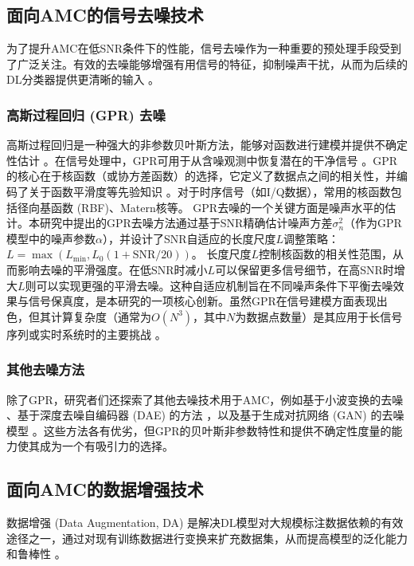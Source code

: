\documentclass[conference]{IEEEtran}
\begin{document}
\subsection{面向AMC的信号去噪技术}
为了提升AMC在低SNR条件下的性能，信号去噪作为一种重要的预处理手段受到了广泛关注。有效的去噪能够增强有用信号的特征，抑制噪声干扰，从而为后续的DL分类器提供更清晰的输入 \cite{b1}\cite{[15]}\cite{[16_MISSING]}\cite{[20]}\cite{[30_MISSING]}\cite{[52_MISSING]}。
\subsubsection{高斯过程回归 (GPR) 去噪}
高斯过程回归是一种强大的非参数贝叶斯方法，能够对函数进行建模并提供不确定性估计 \cite{[17]}\cite{[18]}\cite{[53_MISSING]}。在信号处理中，GPR可用于从含噪观测中恢复潜在的干净信号 \cite{[54_MISSING]}。GPR的核心在于核函数（或协方差函数）的选择，它定义了数据点之间的相关性，并编码了关于函数平滑度等先验知识 \cite{[17]}。对于时序信号（如I/Q数据），常用的核函数包括径向基函数 (RBF)、Matern核等。 %
GPR去噪的一个关键方面是噪声水平的估计。本研究中提出的GPR去噪方法通过基于SNR精确估计噪声方差$\sigma_n^2$（作为GPR模型中的噪声参数$\alpha$），并设计了SNR自适应的长度尺度$L$调整策略：$L = \max(L_{\min}, L_0(1+\mathrm{SNR}/20))$。 %
长度尺度$L$控制核函数的相关性范围，从而影响去噪的平滑强度。在低SNR时减小$L$可以保留更多信号细节，在高SNR时增大$L$则可以实现更强的平滑去噪。这种自适应机制旨在不同噪声条件下平衡去噪效果与信号保真度，是本研究的一项核心创新。虽然GPR在信号建模方面表现出色，但其计算复杂度（通常为$O(N^3)$，其中$N$为数据点数量）是其应用于长信号序列或实时系统时的主要挑战 \cite{[17]}。

\subsubsection{其他去噪方法}
除了GPR，研究者们还探索了其他去噪技术用于AMC，例如基于小波变换的去噪 \cite{[55]}\cite{[56]}、基于深度去噪自编码器 (DAE) 的方法 \cite{[20]}，以及基于生成对抗网络 (GAN) 的去噪模型 \cite{[15]}\cite{[16_MISSING]}。这些方法各有优劣，但GPR的贝叶斯非参数特性和提供不确定性度量的能力使其成为一个有吸引力的选择。

\subsection{面向AMC的数据增强技术}
数据增强 (Data Augmentation, DA) 是解决DL模型对大规模标注数据依赖的有效途径之一，通过对现有训练数据进行变换来扩充数据集，从而提高模型的泛化能力和鲁棒性 \cite{[5]}\cite{[19]}\cite{[49_MISSING]}\cite{[51_MISSING]}。
\end{document}
